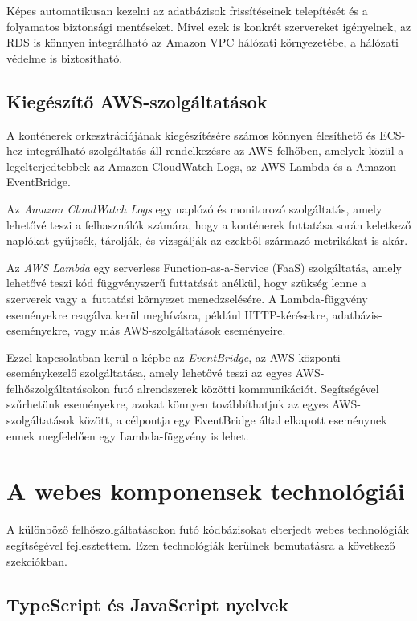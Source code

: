 Képes automatikusan kezelni az adatbázisok frissítéseinek telepítését és a folyamatos biztonsági mentéseket. Mivel ezek is konkrét szervereket igényelnek, az RDS is könnyen integrálható az Amazon VPC hálózati környezetébe, a hálózati védelme is biztosítható.

\subsection{Kiegészítő AWS-szolgáltatások}

A konténerek orkesztrációjának kiegészítésére számos könnyen élesíthető és ECS-hez integrálható szolgáltatás áll rendelkezésre az AWS-felhőben, amelyek közül a legelterjedtebbek az Amazon CloudWatch Logs, az AWS Lambda és a Amazon EventBridge.

Az \emph{Amazon CloudWatch Logs} egy naplózó és monitorozó szolgáltatás, amely lehetővé teszi a felhasználók számára, hogy a konténerek futtatása során keletkező naplókat gyűjtsék, tárolják, és vizsgálják az ezekből származó metrikákat is akár.

Az \emph{AWS Lambda} egy serverless Function-as-a-Service (FaaS) szolgáltatás, amely lehetővé teszi kód függvényszerű futtatását anélkül, hogy szükség lenne a szerverek vagy a~futtatási környezet menedzselésére. A Lambda-függvény eseményekre reagálva kerül meghívásra, például HTTP-kérésekre, adatbázis-eseményekre, vagy más AWS-szolgáltatások eseményeire.

Ezzel kapcsolatban kerül a képbe az \emph{EventBridge}, az AWS központi eseménykezelő szolgáltatása, amely lehetővé teszi az egyes AWS-felhőszolgáltatásokon futó alrendszerek közötti kommunikációt. Segítségével szűrhetünk eseményekre, azokat könnyen továbbíthatjuk az egyes AWS-szolgáltatások között, a célpontja egy EventBridge által elkapott eseménynek ennek megfelelően egy Lambda-függvény is lehet.

\section{A webes komponensek technológiái}

A különböző felhőszolgáltatásokon futó kódbázisokat elterjedt webes technológiák segítségével fejlesztettem. Ezen technológiák kerülnek bemutatásra a következő szekciókban.

\subsection{TypeScript és JavaScript nyelvek}

